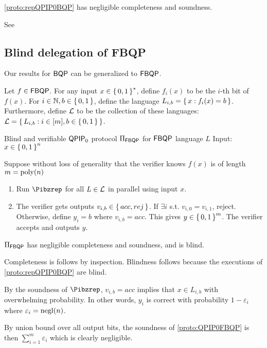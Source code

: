\begin{thm}
	\cref{proto:repQPIP0BQP} has negligible completeness and soundness.
\end{thm}
\begin{prf}
	See \cite{parallelrep, alagic2019twomessage}
\end{prf}

\subsection{Blind delegation of FBQP}


Our results for $\operatorname{\mathsf{BQP}}$ can be generalized to $\operatorname{\mathsf{FBQP}}$.

Let $f\in\operatorname{\mathsf{FBQP}}$.
For any input $x\in\set{0, 1}^*$, define $f_i(x)$ to be the $i$-th bit of $f(x)$.
For $i\in\mathbb{N}, b\in\set{0,1}$, define the language $L_{i, b}=\set{x:f_i(x)=b}$.
Furthermore, define ${\cal L}$ to be the collection of these languages: ${\cal L} = \set{L_{i, b}: i\in[m], b\in\set{0, 1}}$.

\begin{protocol}{Blind and verifiable $\operatorname{\mathsf{QPIP}}_0$ protocol $\Pi_{\operatorname{\mathsf{FBQP}}}$ for $\operatorname{\mathsf{FBQP}}$ language $L$}
	\label{proto:QPIP0FBQP}
	Input: $x\in\set{0, 1}^n$

	Suppose without loss of generality that the verifier knows $f(x)$ is of length $m=\operatorname*{\operatorname{poly}}(n)$ 
	\begin{enumerate}
		\item Run $\Pibzrep$ for all $L\in{\cal L}$ in parallel using input $x$.
		\item The verifier gets outputs $v_{i, b}\in\set{acc, rej}$.
			If $\exists i$ s.t. $v_{i,0}=v_{i,1}$, reject.
			Otherwise, define $y_i = b$ where $v_{i, b}=acc$. This gives $y\in\set{0,1}^m$.
			The verifier accepts and outputs $y$.
	\end{enumerate}
\end{protocol}

\begin{theorem}
	$\Pi_{\operatorname{\mathsf{FBQP}}}$ has negligible completeness and soundness, and is blind.
\end{theorem}
\begin{prf}
	Completeness is follows by inspection.
	Blindness follows because the executions of \cref{proto:repQPIP0BQP} are blind.

	By the soundness of $\Pibzrep$, $v_{i, b}=acc$ implies that $x\in L_{i, b}$ with overwhelming probability.
	In other words, $y_i$ is correct with probability $1-\varepsilon_i$ where $\varepsilon_i=\operatorname{negl}(n)$. 
	
	By union bound over all output bits, the soundness of \cref{proto:QPIP0FBQP} is then
	$\sum_{i=1}^m \varepsilon_i$
	which is clearly negligible.
\end{prf}
